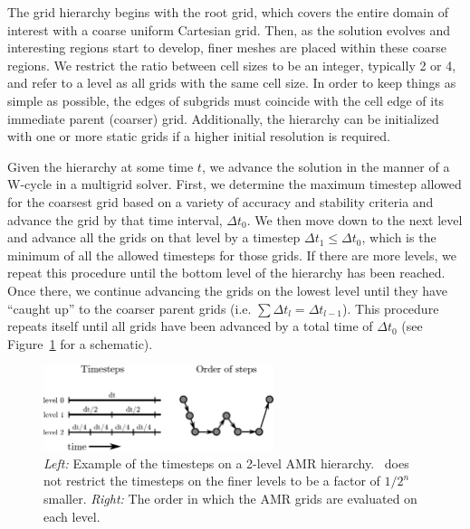 The grid hierarchy begins with the root grid, which covers the entire
domain of interest with a coarse uniform Cartesian grid. Then, as
the solution evolves and interesting regions start to develop, finer meshes are
placed within these coarse regions.
We restrict the ratio between cell sizes to be an integer, typically 2
or 4, and refer to a level as all grids with the same cell size.  In
order to keep things as simple as possible, the edges of subgrids must
coincide with the cell edge of its immediate parent (coarser)
grid. Additionally, the hierarchy can be initialized with one or more
static grids if a higher initial resolution is required.

Given the hierarchy at some time $t$, we advance the solution in the
manner of a W-cycle in a multigrid solver.  First, we determine the
maximum timestep allowed for the coarsest grid based on a variety of
accuracy and stability criteria and advance the grid by that time
interval, $\Delta t_0$.  We then move down to the next level and
advance all the grids on that level by a timestep $\Delta t_1 \leq
\Delta t_0$, which is the minimum of all the allowed timesteps for
those grids.  If there are more levels, we repeat this procedure until
the bottom level of the hierarchy has been reached.  Once there, we
continue advancing the grids on the lowest level until they have
``caught up'' to the coarser parent grids (i.e. $\sum \Delta t_l =
\Delta t_{l-1}$).  This procedure repeats itself until all grids have
been advanced by a total time of $\Delta t_0$ (see
Figure~\ref{fig:wcycle} for a schematic).


\begin{figure}
\begin{center}
\includegraphics[width=0.6\textwidth]{figures/timestepping.eps}
\end{center}
\caption{\emph{Left:} Example of the timesteps on a 2-level AMR
  hierarchy.  \enzo\ does not restrict the timesteps on the finer levels
  to be a factor of $1/2^n$ smaller.  \emph{Right:} The order in which
  the AMR grids are evaluated on each level.\vspace{1ex}}
\label{fig:wcycle}
\end{figure}

